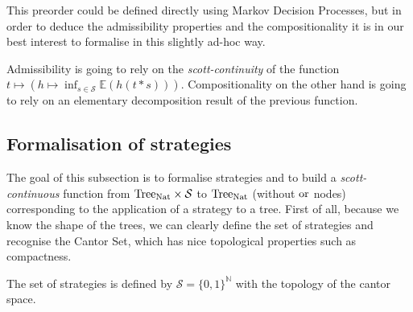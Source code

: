 This preorder could be defined directly using Markov Decision Processes,
but in order to deduce the admissibility properties and the compositionality 
it is in our best interest to formalise in this slightly ad-hoc way.

Admissibility is going to rely on the \emph{scott-continuity} 
of the function $t \mapsto (h \mapsto \inf_{s \in \mathcal{S}} \mathbb{E} (h
(t*s)))$. Compositionality on the other hand is going to rely on an elementary 
decomposition result of the previous function.

\subsection{Formalisation of strategies} 

The goal of this subsection is to formalise strategies and 
to build a \emph{scott-continuous} function from $\textnormal{Tree}_{\textnormal{Nat}} \times \mathcal{S}$
to $\textnormal{Tree}_{\textnormal{Nat}}$ (without $\operatorname{or}$ nodes) corresponding to the 
application of a strategy to a tree.
First of all, because we know the shape of the trees, we can 
clearly define the set of strategies and recognise the Cantor 
Set, which has nice topological properties such as compactness.

\begin{adefinition}[Strategies]
     The set of strategies is 
     defined by $\mathcal{S} = \{ 0, 1 \}^\mathbb{N}$
     with the topology of the cantor space.
\end{adefinition}

